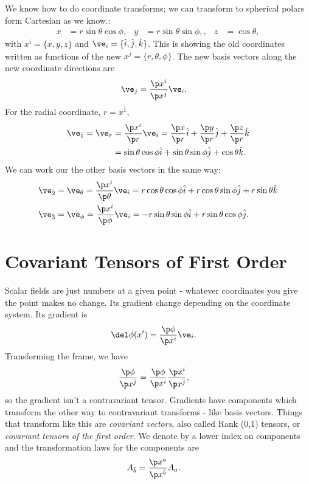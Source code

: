 \documentclass[a4paper, 11pt, normalem]{report}
\begin{document}
\begin{example}
We know how to do coordinate transforms; we can transform to spherical polars form Cartesian as we know.:
\begin{align}
    x &= r\sin\theta\cos\phi, & y &= r\sin\theta\sin\phi, ,& z &= \cos\theta,
\end{align}
with $x^i=\{x,y,z\}$ and $\ve_i=\{\hat{i},\hat{j},\hat{k}\}$.
This is showing the old coordinates written as functions of the new $x^{\bar{j}}=\{r,\theta,\phi\}$.
The new basis vectors along the new coordinate directions are
\begin{align}
    \ve_j &= \frac{\p x^i}{\p x^{\bar{j}}}\ve_i.
\end{align}
For the radial coordinate, $r=x^{\bar{1}}$,
\begin{align}
    \begin{split}
        \ve_{\bar{1}} = \ve_r &= \frac{\p x^i}{\p r}\ve_i = \frac{\p x}{\p r}\hat{i} + \frac{\p y}{\p r}\hat{j} + \frac{\p z}{\p r}\hat{k} \\
                              &= \sin\theta\cos\phi\hat{i} + \sin\theta\sin\phi\hat{j} + \cos\theta\hat{k}.
    \end{split}
\end{align}
We can work our the other basis vectors in the same way:
\begin{align}
    \ve_{\bar{2}} &= \ve_{\theta} = \frac{\p x^i}{\p\theta}\ve_i = r\cos\theta\cos\phi\hat{i}+r\cos\theta\sin\phi\hat{j}+r\sin\theta\hat{k} \\
    \ve_{\bar{3}} &= \ve_{\phi} = \frac{\p x^i}{\p\phi}\ve_i = -r\sin\theta\sin\phi\hat{i}+r\sin\theta\cos\phi\hat{j}.
\end{align} 
\end{example}

\section{Covariant Tensors of First Order}
Scalar fields are just numbers at a given point - whatever coordinates you give the point makes no change. 
Its gradient  change depending on the coordinate system. 
Its gradient is
\begin{align}
    \del\phi(x') &= \frac{\p\phi}{\p x^i}\ve_i.
\end{align}
Transforming the frame, we have
\begin{align}
    \frac{\p\phi}{\p x^{\bar{j}}} &= \frac{\p\phi}{\p x^i}\frac{\p x^i}{\p x^{\bar{j}}},
\end{align}
so the gradient isn't a contravariant tensor. 
Gradients have components which transform the other way to contravariant transforms - like basis vectors.
Things that transform like this are \emph{covariant vectors}, also called Rank (0,1) tensors, or \emph{covariant tensors of the first order}.
We denote by a lower index on components and the transformation laws for the components are
\begin{align}
    A_{\bar{b}} &= \frac{\p x^a}{\p x^{\bar{b}}}A_a.
\end{align}
\end{document}

